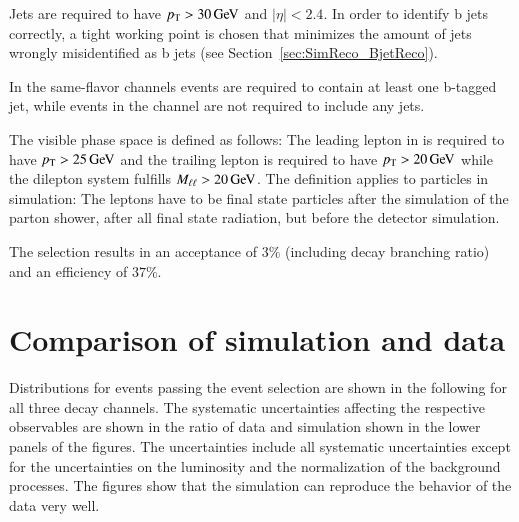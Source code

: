 Jets are required to have $p_{\mathrm{T}} > 30 \,\text{Ge\hspace{-.08em}V}$ and $|\eta|<2.4$. In order to identify b jets correctly, a tight working point is chosen that minimizes the amount of jets wrongly misidentified as b jets (see Section~\ref{sec:SimReco_BjetReco}).

In the same-flavor channels events are required to contain at least one b-tagged jet, while events in the \emu channel are not required to include any jets.

The visible phase space is defined as follows: The leading lepton in \pt is required to have $p_{\mathrm{T}} > 25 \,\text{Ge\hspace{-.08em}V}$ and the trailing lepton is required to have $p_{\mathrm{T}} > 20 \,\text{Ge\hspace{-.08em}V}$ while the dilepton system fulfills $M_{\ell\ell} > 20 \,\text{Ge\hspace{-.08em}V}$. 
The definition applies to particles in simulation: The leptons have to be final state particles after the simulation of the parton shower,
after all final state radiation, but before the detector simulation.

The selection results in an acceptance of $3\%$ (including \ttbar decay branching ratio) and an efficiency of $37\%$.

\section{Comparison of simulation and data}
\label{sec:xsec_datamc}

Distributions for events passing the event selection are shown in the following for all three decay channels. 
The systematic uncertainties affecting the respective observables are shown in the ratio of data and simulation shown in the lower panels of the figures. 
The uncertainties include all systematic uncertainties except for the uncertainties on the luminosity and the normalization of the background processes.
The figures show that the simulation can reproduce the behavior of the data very well. 


